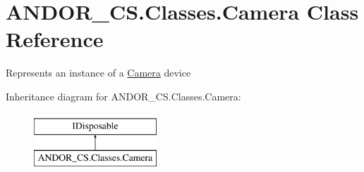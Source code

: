 \hypertarget{class_a_n_d_o_r___c_s_1_1_classes_1_1_camera}{}\section{A\+N\+D\+O\+R\+\_\+\+C\+S.\+Classes.\+Camera Class Reference}
\label{class_a_n_d_o_r___c_s_1_1_classes_1_1_camera}


Represents an instance of a \hyperlink{class_a_n_d_o_r___c_s_1_1_classes_1_1_camera}{Camera} device  


Inheritance diagram for A\+N\+D\+O\+R\+\_\+\+C\+S.\+Classes.\+Camera\+:\begin{figure}[H]
\begin{center}
\leavevmode
\includegraphics[height=2.000000cm]{class_a_n_d_o_r___c_s_1_1_classes_1_1_camera}
\end{center}
\end{figure}
